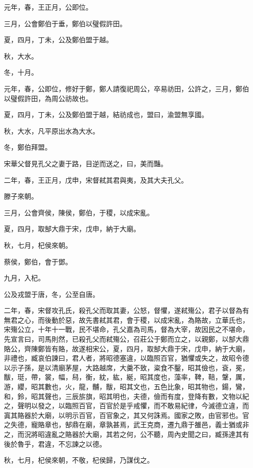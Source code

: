 
\begin{pinyinscope}
元年，春，王正月，公即位。

三月，公會鄭伯于垂，鄭伯以璧假許田。

夏，四月，丁未，公及鄭伯盟于越。

秋，大水。

冬，十月。

元年，春，公即位，修好于鄭，鄭人請復祀周公，卒易祊田，公許之，三月，鄭伯以璧假許田，為周公祊故也。

夏，四月，丁未，公及鄭伯盟于越，結祊成也，盟曰，渝盟無享國。

秋，大水，凡平原出水為大水。

冬，鄭伯拜盟。

宋華父督見孔父之妻于路，目逆而送之，曰，美而豔。

二年，春，王正月，戊申，宋督弒其君與夷，及其大夫孔父。

滕子來朝。

三月，公會齊侯，陳侯，鄭伯，于稷，以成宋亂。

夏，四月，取郜大鼎于宋，戊申，納于大廟。

秋，七月，杞侯來朝。

蔡侯，鄭伯，會于鄧。

九月，入杞。

公及戎盟于唐，冬，公至自唐。

二年，春，宋督攻孔氏，殺孔父而取其妻，公怒，督懼，遂弒殤公，君子以督為有無君之心，而後動於惡，故先書弒其君，會于稷，以成宋亂，為賂故，立華氏也，宋殤公立，十年十一戰，民不堪命，孔父嘉為司馬，督為大宰，故因民之不堪命，先宣言曰，司馬則然，已殺孔父而弒殤公，召莊公于鄭而立之，以親鄭，以郜大鼎賂公，齊陳鄭皆有賂，故遂相宋公，夏，四月，取郜大鼎于宋，戊申，納于大廟，非禮也，臧哀伯諫曰，君人者，將昭德塞違，以臨照百官，猶懼或失之，故昭令德以示子孫，是以清廟茅屋，大路越席，大羹不致，粢食不鑿，昭其儉也，袞，冕，黻，珽，帶，裳，幅，舄，衡，紞，紘，綖，昭其度也，藻率，鞞，鞛，鞶，厲，游，纓，昭其數也，火，龍，黼，黻，昭其文也，五色比象，昭其物也，鍚，鸞，和，鈴，昭其聲也，三辰旂旗，昭其明也，夫德，儉而有度，登降有數，文物以紀之，聲明以發之，以臨照百官，百官於是乎戒懼，而不敢易紀律，今滅德立違，而寘其賂器於大廟，以明示百官，百官象之，其又何誅焉。國家之敗，由官邪也。官之失德，寵賂章也，郜鼎在廟，章孰甚焉，武王克商，遷九鼎于雒邑，義士猶或非之，而況將昭違亂之賂器於大廟，其若之何，公不聽，周內史聞之曰，臧孫達其有後於魯乎，君違，不忘諫之以德。

秋，七月，杞侯來朝，不敬，杞侯歸，乃謀伐之。


\end{pinyinscope}
